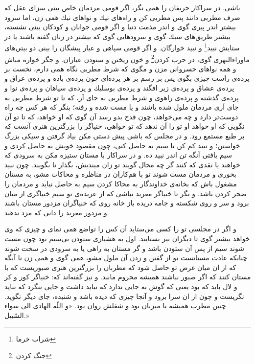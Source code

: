 باشى. در سراكار حريفان را همى نگر، اگر قومى مردمان خاص بينى سزاى عقل كه صرف مطربى دانند پس مطربى كن و راه‌هاى نيك و نواهاى نيك همى زن، اما سرود بيشتر اندر پيرى گوى و اندر مذمت دنيا و اگر قومى جوانان و كودكان بينى نشسته، بيشتر طريق‌هاى سبك گوى و سرودهايى گوى كه بيشتر در زنان گفته باشند يا در ستايش نبيد\footnote{شراب خرما} و نبيد خوارگان. و اگر قومى سپاهى و عيار پيشگان را بينى دو بيتي‌هاى ماوراءالنهرى گوى، در حرب كردن\footnote{جنگ کردن} و خون ريختن و ستودن عياران. و جگر خواره مباش و همه نواهاى خسروانى مزن و مگوى كه شرط مطربى نگاه همى دارم، نخست بر پرده‌ی راست چيزى بگوى پس بر رسم بر هر پرده‌اى چون پرده‌ی باده و پرده‌ی عراق و پرده‌ی عشاق و پرده‌ی زير افگند و پرده‌ی بوسليك و پرده‌ی سپاهان و پرده‌ی نوا و پرده‌ی گذشته و پرده‌ی راهوى و شرط مطربى به جاى آر، كه تا تو شرط مطربى به جاى آرى مردمان ملول شده باشند و يا مست شده و رفته؛ بنگر كه هر كس چه راه دوست‌تر دارد و چه مى‌خواهد، چون قدح بدو رسد آن گوى كه او خواهد، كه تا تو آن نگويى كه او خواهد او تو را آن ندهد كه تو خواهى، خنياگر را بزرگترين هنرى آنست كه بر طبع مستمع رود. و در مجلس كه باشى پيش دستى مكن بياد گرفتن و سيكى بزرگ خواستن؛ و نبيد كم كن تا سيم به حاصل كنى، چون مقصود خويش به حاصل كردى و سيم يافتى آنگه تن اندر نبيد ده. و در سراكار با مستان ستيزه مكن به سرودى كه خواهند يا نقدى كه كنند گر چه محال گويند تو زان مينديش، بگذار تا بگويند. چون نبيد بخورى و مردمان مست شوند تو با هم‌كاران در مناظره و محاكات مشو، به مستان مشغول باش كه بخانه‌ی خداوندگار به محاكا كردن سيم به حاصل نيايد و مردمان را ضجر كردن باشد. و نگر تا خنياگر معربد نباشى كه از عربده‌ی تو سيم خنياگرى از ميان برود و سر و روى شكسته و جامه دريده باز خانه روى كه خنياگران مزدور مستان باشند و مزدور معربد را دانى كه مزد ندهند.

و اگر در مجلسى تو را كسى مى‌ستايد آن كس را تواضع همى نماى و چيزى كه وى خواهد بيشتر گوى تا ديگران نيز بستايند. اول به هشيارى ستودن بى‌سيم بود چون مست شوند سيم از پس آن ستودن باشد و گر مستان به راهى يا به سرودى در سخت شوند چنانكه عادت مستانست تو از گفتن و زدن آن ملول مشو، همى گوى و همى زن تا آنگه كه از ان ميان غرض تو حاصل شود كه مطربان را بزرگترين هنرى صبوريست كه با مستان كنند كه اگر صبور نباشند هميشه محروم مانند. و نيز گفته‌اند كه: خنياگر كور و كر و لال بايد كه بود يعنى كه گوش به جايى ندارد كه نبايد داشت و جايى ننگرد كه نبايد نگريست و چون از ان سرا برود و آنجا چيزى كه ديده باشد و شنيده، جاى ديگر نگويد. چنين مطرب هميشه با ميزبان بود و شغلش روان بود. «و اللّه الهادى الى سواء السّبيل.» 

\newpage

